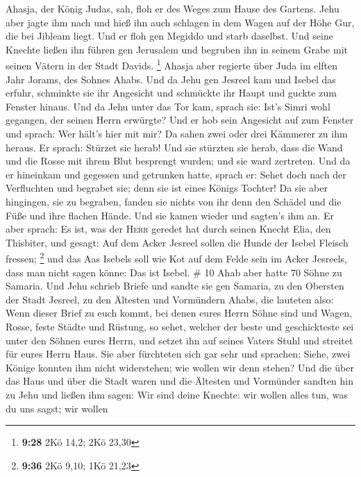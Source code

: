 Ahasja, der König Judas, sah, floh er des Weges zum Hause des Gartens.
Jehu aber jagte ihm nach und hieß ihn auch schlagen in dem Wagen auf der
Höhe Gur, die bei Jibleam liegt. Und er floh gen Megiddo und starb
daselbst.  Und seine Knechte ließen ihn führen gen
Jerusalem und begruben ihn in seinem Grabe mit seinen Vätern in der
Stadt Davids. \footnote{\textbf{9:28} 2Kö 14,2; 2Kö 23,30}
 Ahasja aber regierte über Juda im elften Jahr Jorams,
des Sohnes Ahabs.  Und da Jehu gen Jesreel kam und Isebel
das erfuhr, schminkte sie ihr Angesicht und schmückte ihr Haupt und
guckte zum Fenster hinaus.  Und da Jehu unter das Tor
kam, sprach sie: Ist's Simri wohl gegangen, der seinen Herrn erwürgte?
 Und er hob sein Angesicht auf zum Fenster und sprach:
Wer hält's hier mit mir? Da sahen zwei oder drei Kämmerer zu ihm heraus.
 Er sprach: Stürzet sie herab! Und sie stürzten sie
herab, dass die Wand und die Rosse mit ihrem Blut besprengt wurden; und
sie ward zertreten.  Und da er hineinkam und gegessen und
getrunken hatte, sprach er: Sehet doch nach der Verfluchten und begrabet
sie; denn sie ist eines Königs Tochter!  Da sie aber
hingingen, sie zu begraben, fanden sie nichts von ihr denn den Schädel
und die Füße und ihre flachen Hände.  Und sie kamen
wieder und sagten's ihm an. Er aber sprach: Es ist, was der
\textsc{Herr} geredet hat durch seinen Knecht Elia, den Thisbiter, und
gesagt: Auf dem Acker Jesreel sollen die Hunde der Isebel Fleisch
fressen; \footnote{\textbf{9:36} 2Kö 9,10; 1Kö 21,23} 
und das Aas Isebels soll wie Kot auf dem Felde sein im Acker Jesreels,
dass man nicht sagen könne: Das ist Isebel. \# 10  Ahab
aber hatte 70 Söhne zu Samaria. Und Jehu schrieb Briefe und sandte sie
gen Samaria, zu den Obersten der Stadt Jesreel, zu den Ältesten und
Vormündern Ahabs, die lauteten also:  Wenn dieser Brief zu
euch kommt, bei denen eures Herrn Söhne sind und Wagen, Rosse, feste
Städte und Rüstung,  so sehet, welcher der beste und
geschickteste sei unter den Söhnen eures Herrn, und setzet ihn auf
seines Vaters Stuhl und streitet für eures Herrn Haus. 
Sie aber fürchteten sich gar sehr und sprachen: Siehe, zwei Könige
konnten ihm nicht widerstehen; wie wollen wir denn stehen?
 Und die über das Haus und über die Stadt waren und die
Ältesten und Vormünder sandten hin zu Jehu und ließen ihm sagen: Wir
sind deine Knechte: wir wollen alles tun, was du uns sagst; wir wollen
